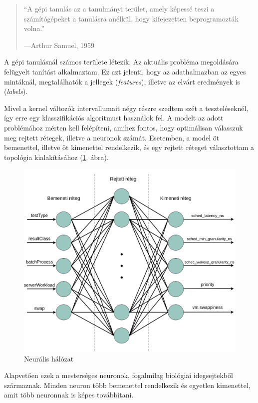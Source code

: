 \begin{quote}
``A gépi tanulás az a tanulmányi terület, amely képessé teszi a számítógépeket a tanulásra
anélkül, hogy kifejezetten beprogramozták volna.''
\par\nobreak\smallskip\hfill—Arthur Samuel, 1959
\end{quote}

A gépi tanulásnál számos területe létezik. Az aktuális probléma megoldására felügyelt tanítást alkalmaztam. Ez azt jelenti, hogy az adathalmazban az egyes mintáknál, megtalálhatók a jellegek (\textit{features}), illetve az elvárt eredmények is (\textit{labels}).

Mivel a kernel változók intervallumait négy részre szedtem szét a teszteléseknél, így erre egy klasszifikációs algoritmust használok fel.
A modelt az adott problémához mérten kell felépíteni, amihez fontos, hogy optimálisan válasszuk meg rejtett rétegek, illetve a neuronok számát.
Esetemben, a model öt bemenettel, illetve öt kimenettel rendelkezik, és egy rejtett réteget választottam a topológia kialakításához (\ref{fig:neuralnetwork}. ábra).

\begin{figure}[h!]
\centering
\includegraphics[width=\textwidth]{images/neuralNetwork.png}
\caption{Neurális hálózat}
\label{fig:neuralnetwork}
\end{figure}

Alapvetően ezek a mesterséges neuronok, fogalmilag biológiai idegsejtekből származnak.
Minden neuron több bemenettel rendelkezik és egyetlen kimenettel, amit több neuronnak is képes továbbítani.

